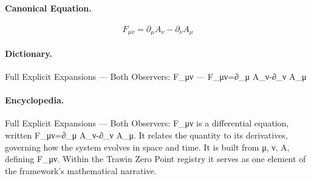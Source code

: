 \paragraph{Canonical Equation.}
\[
F_{\mu\nu}=\partial_\mu A_\nu-\partial_\nu A_\mu
\]

\paragraph{Dictionary.}
Full Explicit Expansions — Both Observers: F\_μν — F\_μν=∂\_μ A\_ν-∂\_ν A\_μ

\paragraph{Encyclopedia.}
Full Explicit Expansions — Both Observers: F\_μν is a differential equation, written F\_μν=∂\_μ A\_ν-∂\_ν A\_μ. It relates the quantity to its derivatives, governing how the system evolves in space and time. It is built from μ, ν, A, defining F\_μν. Within the Trawin Zero Point registry it serves as one element of the framework's mathematical narrative.
